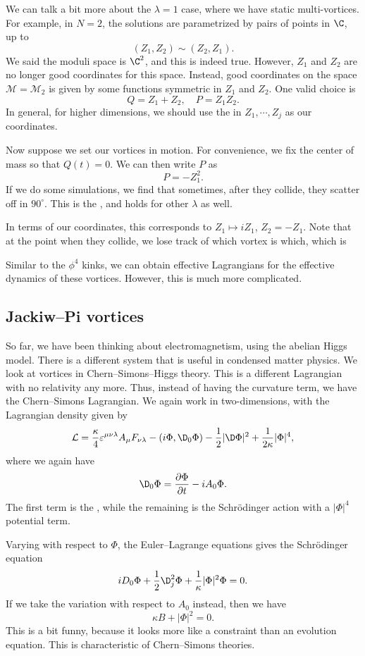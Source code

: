\documentclass[a4paper]{article}
\begin{document}
We can talk a bit more about the $\lambda = 1$ case, where we have static multi-vortices. For example, in $N = 2$, the solutions are parametrized by pairs of points in $\C$, up to
\[
  (Z_1, Z_2) \sim (Z_2, Z_1).
\]
We said the moduli space is $\C^2$, and this is indeed true. However, $Z_1$ and $Z_2$ are no longer good coordinates for this space. Instead, good coordinates on the space $\mathcal{M} = \mathcal{M}_2$ is given by some functions symmetric in $Z_1$ and $Z_2$. One valid choice is
\[
  Q = Z_1 + Z_2,\quad P = Z_1 Z_2.
\]
In general, for higher dimensions, we should use the  in $Z_1, \cdots, Z_j$ as our coordinates.

Now suppose we set our vortices in motion. For convenience, we fix the center of mass so that $Q(t) = 0$. We can then write $P$ as
\[
  P = - Z_1^2.
\]
If we do some simulations, we find that sometimes, after they collide, they scatter off in $90^\circ$. This is the , and holds for other $\lambda$ as well.

In terms of our coordinates, this corresponds to $Z_1 \mapsto i Z_1$, $Z_2 = - Z_1$. Note that at the point when they collide, we lose track of which vortex is which, which is

Similar to the $\phi^4$ kinks, we can obtain effective Lagrangians for the effective dynamics of these vortices. However, this is much more complicated.

\subsection{Jackiw--Pi vortices}
So far, we have been thinking about electromagnetism, using the abelian Higgs model. There is a different system that is useful in condensed matter physics. We look at vortices in Chern--Simons--Higgs theory. This is a different Lagrangian with no relativity any more. Thus, instead of having the curvature term, we have the Chern--Simons Lagrangian. We again work in two-dimensions, with the Lagrangian density given by
\[
  \mathcal{L} = \frac{\kappa}{4} \varepsilon^{\mu\nu\lambda} A_\mu F_{\nu\lambda} - (i \Phi, \D_0 \Phi) - \frac{1}{2} | \D \Phi|^2 + \frac{1}{2\kappa} |\Phi|^4,
\]
where we again have
\[
  \D_0 \Phi = \frac{\partial \Phi}{\partial t} - i A_0 \Phi.
\]
The first term is the , while the remaining is the Schr\"odinger action with a $|\Phi|^4$ potential term.

Varying with respect to $\Phi$, the Euler--Lagrange equations gives the Schr\"odinger equation
\[
  i D_0 \Phi + \frac{1}{2} \D_j^2 \Phi + \frac{1}{\kappa} |\Phi|^2 \Phi = 0.
\]
If we take the variation with respect to $A_0$ instead, then we have
\[
  \kappa B + |\Phi|^2 = 0.
\]
This is a bit funny, because it looks more like a constraint than an evolution equation. This is characteristic of Chern--Simons theories.
\end{document}
